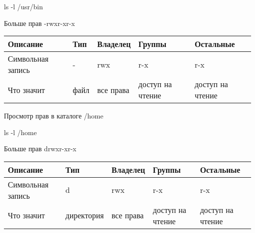 \begin{BashBox}
    ls -l /usr/bin
\end{BashBox}

Больше прав -rwxr-xr-x

\begin{table}[h!]
    \centering
    \begin{tabular}{ | l | l | l | l | l | }
        \hline
        Описание            & Тип   & Владелец  & Группы            & Остальные       \\ \hline
        \hline
        Символьная  запись  & -     & rwx       & r-x               & r-x             \\ \hline
        Что значит          & файл  & все права & доступ на чтение  & доступ на чтение\\ \hline
    \end{tabular}
\end{table}

Просмотр прав в каталоге /home

\begin{BashBox}
    ls -l /home
\end{BashBox}

Больше прав drwxr-xr-x


\begin{table}[h!]
    \centering
    \begin{tabular}{ | l | l | l | l | l | }
        \hline
        Описание            & Тип       & Владелец  & Группы            & Остальные       \\ \hline
        \hline
        Символьная  запись  & d         & rwx       & r-x               & r-x             \\ \hline
        Что значит          & директория& все права & доступ на чтение  & доступ на чтение\\ \hline
    \end{tabular}
\end{table}
